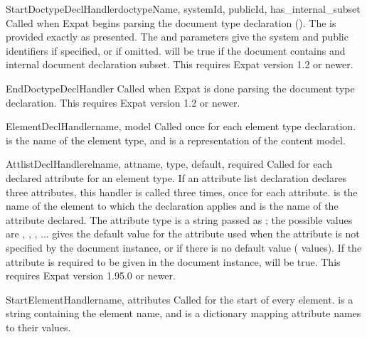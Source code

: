 \begin{methoddesc}[xmlparser]{StartDoctypeDeclHandler}{doctypeName,
                                                       systemId, publicId,
                                                       has_internal_subset}
Called when Expat begins parsing the document type declaration
().  The  is provided exactly
as presented.  The  and  parameters give
the system and public identifiers if specified, or  if
omitted.   will be true if the document
contains and internal document declaration subset.
This requires Expat version 1.2 or newer.
\end{methoddesc}

\begin{methoddesc}[xmlparser]{EndDoctypeDeclHandler}{}
Called when Expat is done parsing the document type declaration.
This requires Expat version 1.2 or newer.
\end{methoddesc}

\begin{methoddesc}[xmlparser]{ElementDeclHandler}{name, model}
Called once for each element type declaration.   is the name
of the element type, and  is a representation of the
content model.
\end{methoddesc}

\begin{methoddesc}[xmlparser]{AttlistDeclHandler}{elname, attname,
                                                  type, default, required}
Called for each declared attribute for an element type.  If an
attribute list declaration declares three attributes, this handler is
called three times, once for each attribute.   is the name
of the element to which the declaration applies and  is
the name of the attribute declared.  The attribute type is a string
passed as ; the possible values are ,
, , ...
 gives the default value for the attribute used when the
attribute is not specified by the document instance, or  if
there is no default value ( values).  If the attribute
is required to be given in the document instance,  will
be true.
This requires Expat version 1.95.0 or newer.
\end{methoddesc}

\begin{methoddesc}[xmlparser]{StartElementHandler}{name, attributes}
Called for the start of every element.   is a string
containing the element name, and  is a dictionary
mapping attribute names to their values.
\end{methoddesc}

